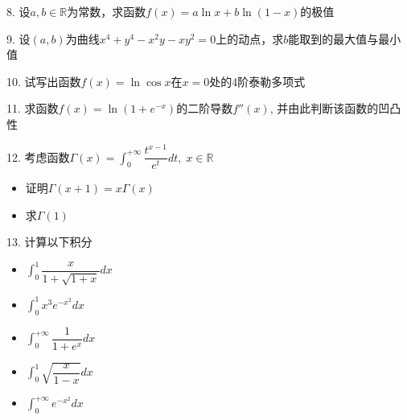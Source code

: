 \documentclass[10pt]{beamer}
\begin{document}

\begin{frame}

8. 设$a,b\in\mathbb{R}$为常数，求函数$f(x) = a \ln x + b \ln (1-x)$的极值

\vspace{1em}

9. 设$(a,b)$为曲线$x^4+y^4-x^2y-xy^2 = 0$上的动点，求$b$能取到的最大值与最小值

\vspace{1em}

10. 试写出函数$f(x) = \ln\cos x$在$x=0$处的4阶泰勒多项式

\vspace{1em}

11. 求函数$f(x) = \ln(1+e^{-x})$的二阶导数$f''(x)$, 并由此判断该函数的凹凸性

\vspace{1em}

12. 考虑函数$\displaystyle \Gamma(x) = \int_0^{+\infty} \dfrac{t^{x-1}}{e^t} dt, \; x\in\mathbb{R}$
\begin{itemize}
\item[(1)] 证明$\Gamma(x+1) = x\Gamma(x)$
\item[(2)] 求$\Gamma(1)$
\end{itemize}

\end{frame}


\begin{frame}

13. 计算以下积分
\begin{itemize}
\item[(1)] $\displaystyle \int_0^1 \dfrac{x}{1+\sqrt{1+x}} dx$
\item[(2)] $\displaystyle \int_0^1 x^3e^{-x^2} dx$
\item[(3)] $\displaystyle \int_0^{+\infty} \dfrac{1}{1+e^x} dx$
\item[(4)] $\displaystyle \int_0^1 \sqrt{\dfrac{x}{1-x}} dx$
\item[($5^*$)] $\displaystyle \int_0^{+\infty} e^{-x^2} dx$
\end{itemize}

\end{frame}

\end{document}
